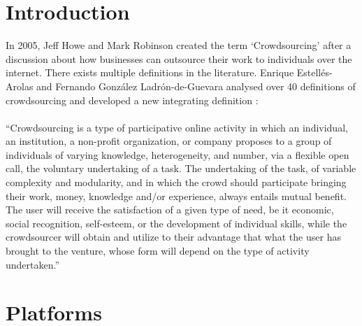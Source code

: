 \section{Introduction}
In 2005, Jeff Howe and Mark Robinson created the term `Crowdsourcing' after a discussion about how businesses can outsource their work to individuals over the internet. There exists multiple definitions in the literature. Enrique Estell\'{e}s-Arolas and Fernando Gonz\'{a}lez Ladr\'{o}n-de-Guevara analysed over 40 definitions of crowdsourcing and developed a new integrating definition \cite{estelles}:\\\\
``Crowdsourcing is a type of participative online activity in which an individual, an institution, a non-profit organization, or company proposes to a group of individuals of varying knowledge, heterogeneity, and number, via a flexible open call, the voluntary undertaking of a task. The undertaking of the task, of variable complexity and modularity, and in which the crowd should participate bringing their work, money, knowledge and/or experience, always entails mutual benefit. The user will receive the satisfaction of a given type of need, be it economic, social recognition, self-esteem, or the development of individual skills, while the crowdsourcer will obtain and utilize to their advantage that what the user has brought to the venture, whose form will depend on the type of activity undertaken.''
\section{Platforms}
